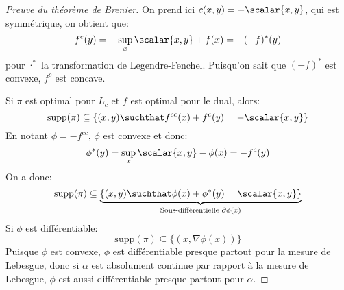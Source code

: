 \begin{proof}[Preuve du théorème de Brenier]
	On prend ici $c(x, y) = -\scalar{x, y}$, qui est symmétrique, on obtient que:
	\begin{equation*}
		f^{c}(y) = -\sup_{x} \scalar{x, y} + f(x) = -(-f)^{*}(y)
	\end{equation*}
	pour $\cdot^{*}$ la transformation de Legendre-Fenchel.
	Puisqu'on sait que $(-f)^{*}$ est convexe, $f^{c}$ est concave.

	Si $\pi$ est optimal pour $L_{c}$ et $f$ est optimal pour le dual, alors:
	\begin{equation*}
		\mathrm{supp}(\pi) \subseteq \left\{(x, y) \suchthat f^{cc}(x) + f^{c}(y) = -\scalar{x, y}\right\}
	\end{equation*}
	En notant $\phi = -f^{cc}$, $\phi$ est convexe et donc:
	\begin{equation*}
		\phi^{*}(y) = \sup_{x} \scalar{x, y} - \phi(x) = -f^{c}(y)
	\end{equation*}
	On a donc:
	\begin{equation*}
		\mathrm{supp}(\pi) \subseteq \underbrace{\left\{(x, y) \suchthat \phi(x) + \phi^{*}(y) = \scalar{x, y}\right\}}_{\text{Sous-différentielle } \partial\phi(x)}
	\end{equation*}
	Si $\phi$ est différentiable:
	\begin{equation*}
		\mathrm{supp}(\pi) \subseteq \{(x, \nabla\phi(x))\}
	\end{equation*}
	Puisque $\phi$ est convexe, $\phi$ est différentiable presque partout pour la mesure de Lebesgue,
	donc si $\alpha$ est absolument continue par rapport à la mesure de Lebesgue, $\phi$ est aussi différentiable presque partout pour $\alpha$.
\end{proof}

